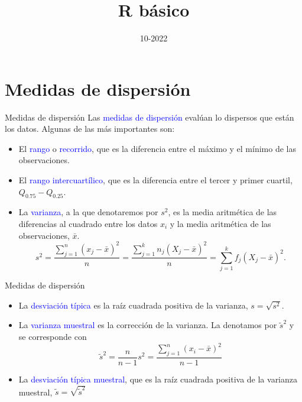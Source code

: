 \documentclass[
  ignorenonframetext,
  aspectratio=169]{beamer}
\title{R básico}
\author{}
\date{\vspace{-2.5em}10-2022}
\newcommand\blue[1]{\textcolor{blue}{#1}}
\begin{document}
\frame{\titlepage}

\begin{frame}[allowframebreaks]
  \tableofcontents[hideallsubsections]
\end{frame}
\hypertarget{medidas-de-dispersiuxf3n}{%
\section{Medidas de dispersión}\label{medidas-de-dispersiuxf3n}}

\begin{frame}{Medidas de dispersión}
\protect\hypertarget{medidas-de-dispersiuxf3n-1}{}
Las \blue{medidas de dispersión} evalúan lo dispersos que están los
datos. Algunas de las más importantes son:

\begin{itemize}
\item
  El \blue{rango} o \blue{recorrido}, que es la diferencia entre el
  máximo y el mínimo de las observaciones.
\item
  El \blue{rango intercuartílico}, que es la diferencia entre el tercer
  y primer cuartil, \(Q_{0.75}-Q_{0.25}\).
\item
  La \blue{varianza}, a la que denotaremos por \(s^2\), es la media
  aritmética de las diferencias al cuadrado entre los datos \(x_i\) y la
  media aritmética de las observaciones, \(\bar{x}\).
  \[s^2 = \frac{\sum_{j=1}^n(x_j-\bar{x})^2}{n}=\frac{\sum_{j=1}^kn_j(X_j-\bar{x})^2}{n}=\sum_{j=1}^kf_j(X_j-\bar{x})^2.\]
\end{itemize}
\end{frame}

\begin{frame}{Medidas de dispersión}
\protect\hypertarget{medidas-de-dispersiuxf3n-2}{}
\begin{itemize}
\item
  La \blue{desviación típica} es la raíz cuadrada positiva de la
  varianza, \(s=\sqrt{s^2}\).
\item
  La \blue{varianza muestral} es la corrección de la varianza. La
  denotamos por \(\tilde{s}^2\) y se corresponde con
  \[\tilde{s}^2 = \frac{n}{n-1}s^2 = \frac{\sum_{j=1}^n(x_i-\bar{x})^2}{n-1}\]
\item
  La \blue{desviación típica muestral}, que es la raíz cuadrada positiva
  de la varianza muestral, \(\tilde{s} = \sqrt{\tilde{s}^2}\)
\end{itemize}
\end{frame}
\end{document}
